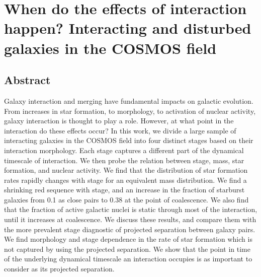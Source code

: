 \chapter{When do the effects of interaction happen? Interacting and disturbed galaxies in the COSMOS field}\label{chapter3}
\section{Abstract}
   Galaxy interaction and merging have fundamental impacts on galactic evolution. From increases in star formation, to morphology, to activation of nuclear activity, galaxy interaction is thought to play a role. However, at what point in the interaction do these effects occur? In this work, we divide a large sample of interacting galaxies in the COSMOS field into four distinct stages based on their interaction morphology. Each stage captures a different part of the dynamical timescale of interaction. We then probe the relation between stage, mass, star formation, and nuclear activity. We find that the distribution of star formation rates rapidly changes with stage for an equivalent mass distribution. We find a shrinking red sequence with stage, and an increase in the fraction of starburst galaxies from 0.1 as close pairs to 0.38 at the point of coalescence. We also find that the fraction of active galactic nuclei is static through most of the interaction, until it increases at coalescence. We discuss these results, and compare them with the more prevalent stage diagnostic of projected separation between galaxy pairs. We find morphology and stage dependence in the rate of star formation which is not captured by using the projected separation. We show that the point in time of the underlying dynamical timescale an interaction occupies is as important to consider as its projected separation.



